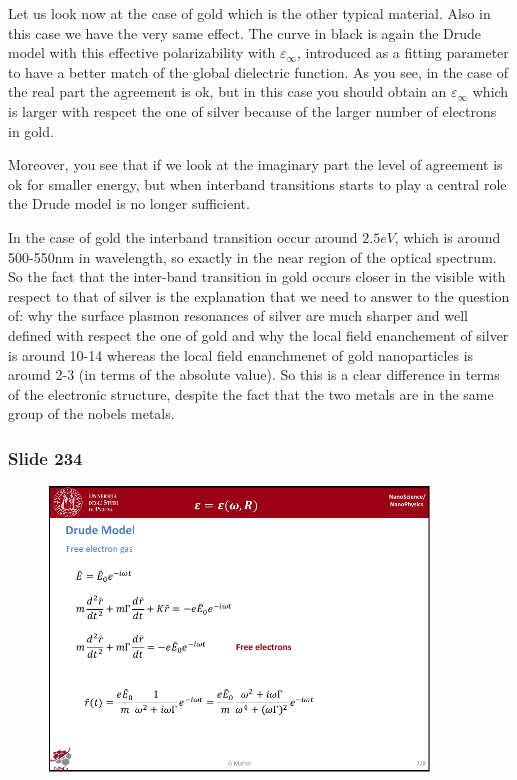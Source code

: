 \documentclass[../main/main.tex]{subfiles}
\begin{document}
Let us look now at the case of gold which is the other typical material. Also in this case we have the very same effect. The curve in black is again the Drude model with this effective polarizability with \( \varepsilon _ \infty  \), introduced as a fitting parameter to have a better match of the global dielectric function. As you see, in the case of the real part the agreement is ok, but in this case you should obtain an \( \varepsilon _ \infty  \) which is larger with respcet the one of silver because of the larger number of electrons in gold.

Moreover, you see that if we look at the imaginary part the level of agreement is ok for smaller energy, but when interband transitions starts to play a central role the Drude model is no longer sufficient.

In the case of gold the interband transition occur around \( 2.5 eV \), which is around 500-550nm in wavelength, so exactly in the near region of the optical spectrum. So the fact that the inter-band transition in gold occurs closer in the visible with respect to that of silver is the explanation that we need to answer to the question of: why the surface plasmon resonances of silver are much sharper and well defined with respect the one of gold and why the local field enanchement of silver is around 10-14 whereas the local field enanchmenet of gold nanoparticles is around 2-3 (in terms of the absolute value).
So this is a clear difference in terms of the electronic structure, despite the fact that the two metals are in the same group of the nobels metals.




\newpage

\subsubsection{Slide 234}

\begin{figure}[h!]
\centering
\includegraphics[page=7,width=0.9\textwidth]{../lessons/pdf_file/15_lesson.pdf}
\end{figure}
\end{document}
